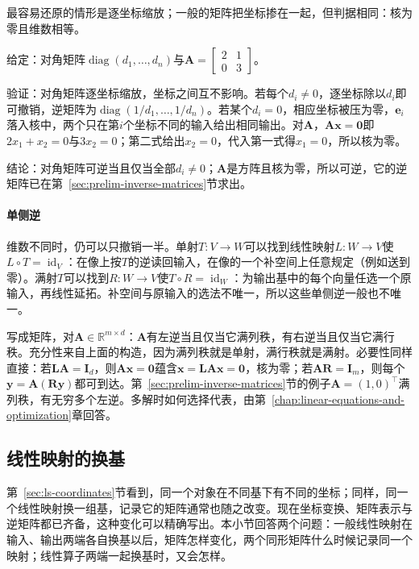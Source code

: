 最容易还原的情形是逐坐标缩放；一般的矩阵把坐标掺在一起，但判据相同：核为零且维数相等。
\begin{example}[用核判断可逆]
\label{ex:ls-kernel-invertibility}
给定：对角矩阵$\operatorname{diag}(d_1,\ldots,d_n)$与$\bm A=\left[\begin{smallmatrix}2&1\\0&3\end{smallmatrix}\right]$。

验证：对角矩阵逐坐标缩放，坐标之间互不影响。若每个$d_i\neq0$，逐坐标除以$d_i$即可撤销，逆矩阵为$\operatorname{diag}(1/d_1,\ldots,1/d_n)$。若某个$d_i=0$，相应坐标被压为零，$\bm e_i$落入核中，两个只在第$i$个坐标不同的输入给出相同输出。对$\bm A$，$\bm A\bm x=\bm0$即$2x_1+x_2=0$与$3x_2=0$；第二式给出$x_2=0$，代入第一式得$x_1=0$，所以核为零。

结论：对角矩阵可逆当且仅当全部$d_i\neq0$；$\bm A$是方阵且核为零，所以可逆，它的逆矩阵已在第~\ref{sec:prelim-inverse-matrices}节求出。
\end{example}

\paragraph{单侧逆}
维数不同时，仍可以只撤销一半。单射$T:V\to W$可以找到线性映射$L:W\to V$使$L\circ T=\operatorname{id}_V$：在像上按$T$的逆读回输入，在像的一个补空间上任意规定（例如送到零）。满射$T$可以找到$R:W\to V$使$T\circ R=\operatorname{id}_W$：为输出基中的每个向量任选一个原输入，再线性延拓。补空间与原输入的选法不唯一，所以这些单侧逆一般也不唯一。

写成矩阵，对$\bm A\in\mathbb R^{m\times d}$：$\bm A$有左逆当且仅当它满列秩，有右逆当且仅当它满行秩。充分性来自上面的构造，因为满列秩就是单射，满行秩就是满射。必要性同样直接：若$\bm L\bm A=\bm I_d$，则$\bm A\bm x=\bm0$蕴含$\bm x=\bm L\bm A\bm x=\bm0$，核为零；若$\bm A\bm R=\bm I_m$，则每个$\bm y=\bm A(\bm R\bm y)$都可到达。第~\ref{sec:prelim-inverse-matrices}节的例子$\bm A=(1,0)^\top$满列秩，有无穷多个左逆。多解时如何选择代表，由第~\ref{chap:linear-equations-and-optimization}章回答。

\subsection{线性映射的换基}
\label{sec:ls-coordinates-change-of-basis}

第~\ref{sec:ls-coordinates}节看到，同一个对象在不同基下有不同的坐标；同样，同一个线性映射换一组基，记录它的矩阵通常也随之改变。现在坐标变换、矩阵表示与逆矩阵都已齐备，这种变化可以精确写出。本小节回答两个问题：一般线性映射在输入、输出两端各自换基以后，矩阵怎样变化，两个同形矩阵什么时候记录同一个映射；线性算子两端一起换基时，又会怎样。

